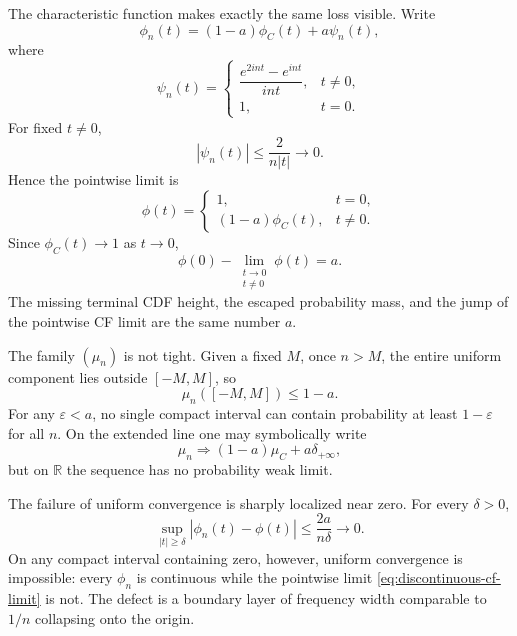 \documentclass[10pt,a4paper]{article}
\numberwithin{equation}{section}
\theoremstyle{blueplain}
\theoremstyle{definition}
\newcommand{\R}{\mathbb R}
\begin{document}
The characteristic function makes exactly the same loss visible.  Write
\[
  \phi_n(t)
  =(1-a)\phi_C(t)+a\psi_n(t),
\]
where
\begin{equation}
  \psi_n(t)
  =
  \begin{cases}
    \dfrac{e^{2int}-e^{int}}{int},&t\ne0,\\[2mm]
    1,&t=0.
  \end{cases}
  \label{eq:uniform-escape-cf}
\end{equation}
For fixed \(t\ne0\),
\[
  |\psi_n(t)|\le\frac{2}{n|t|}\longrightarrow0.
\]
Hence the pointwise limit is
\begin{equation}
  \phi(t)=
  \begin{cases}
    1,&t=0,\\
    (1-a)\phi_C(t),&t\ne0.
  \end{cases}
  \label{eq:discontinuous-cf-limit}
\end{equation}
Since \(\phi_C(t)\to1\) as \(t\to0\),
\begin{equation}
  \phi(0)-\lim_{\substack{t\to0\\t\ne0}}\phi(t)=a.
  \label{eq:escaped-mass-jump}
\end{equation}
The missing terminal CDF height, the escaped probability mass, and the jump of
the pointwise CF limit are the same number \(a\).

The family \((\mu_n)\) is not tight.  Given a fixed \(M\), once \(n>M\), the
entire uniform component lies outside \([-M,M]\), so
\[
  \mu_n([-M,M])\le1-a.
\]
For any \(\varepsilon<a\), no single compact interval can contain probability
at least \(1-\varepsilon\) for all \(n\).  On the extended line one may
symbolically write
\[
  \mu_n\Rightarrow(1-a)\mu_C+a\delta_{+\infty},
\]
but on \(\R\) the sequence has no probability weak limit.

The failure of uniform convergence is sharply localized near zero.  For every
\(\delta>0\),
\begin{equation}
  \sup_{|t|\ge\delta}|\phi_n(t)-\phi(t)|
  \le\frac{2a}{n\delta}\longrightarrow0.
  \label{eq:uniform-away-zero}
\end{equation}
On any compact interval containing zero, however, uniform convergence is
impossible: every \(\phi_n\) is continuous while the pointwise limit
\eqref{eq:discontinuous-cf-limit} is not.  The defect is a boundary layer of
frequency width comparable to \(1/n\) collapsing onto the origin.
\end{document}
